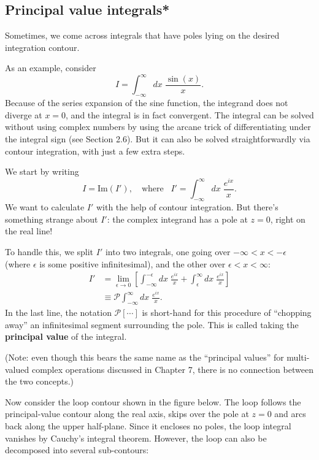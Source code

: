 \documentclass[10pt,a4paper]{article}
\begin{document}
\subsection{Principal value integrals*}
\label{principal-value-integrals}

Sometimes, we come across integrals that have poles lying on the
desired integration contour.

As an example, consider
\begin{equation}
I = \int_{-\infty}^\infty dx\; \frac{\sin(x)}{x}.
\end{equation}
Because of the series expansion of the sine function, the integrand
does not diverge at $x = 0$, and the integral is in fact
convergent. The integral can be solved without using complex numbers
by using the arcane trick of differentiating under the integral sign
(see Section 2.6). But it can also be solved straightforwardly via
contour integration, with just a few extra steps.

We start by writing
\begin{equation}
I = \mathrm{Im}(I'), \quad \mathrm{where}\;\;\; I' = \int_{-\infty}^\infty dx\; \frac{e^{ix}}{x}.
\end{equation}
We want to calculate $I'$ with the help of contour integration. But
there's something strange about $I'$: the complex integrand has a pole
at $z = 0$, right on the real line!

To handle this, we split $I'$ into two integrals, one going over
$-\infty < x < -\epsilon$ (where $\epsilon$ is some positive
infinitesimal), and the other over $\epsilon < x < \infty$:
\begin{align}
  I' &= \lim_{\epsilon \rightarrow 0} \left[ \int_{-\infty}^{-\epsilon} dx\; \frac{e^{ix}}{x} + \int_{\epsilon}^\infty dx\; \frac{e^{ix}}{x}\right] \\
  &\equiv \mathcal{P} \int_{-\infty}^\infty dx\; \frac{e^{ix}}{x}.
\end{align}
In the last line, the notation $\mathcal{P}[\cdots]$ is short-hand for
this procedure of ``chopping away'' an infinitesimal segment
surrounding the pole. This is called taking the \textbf{principal
  value} of the integral.

(Note: even though this bears the same name as the ``principal
values'' for multi-valued complex operations discussed in Chapter 7,
there is no connection between the two concepts.)

Now consider the loop contour shown in the figure below. The loop
follows the principal-value contour along the real axis, skips over
the pole at $z = 0$ and arcs back along the upper half-plane.  Since
it encloses no poles, the loop integral vanishes by Cauchy's integral
theorem.  However, the loop can also be decomposed into several
sub-contours:
\end{document}
